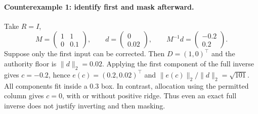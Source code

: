 \paragraph{Counterexample 1: identify first and mask afterward.}
Take $R=I$,
\[
 M=\begin{pmatrix}1&1\\0&0.1\end{pmatrix},\qquad
 d=\begin{pmatrix}0\\0.02\end{pmatrix},\qquad
 M^{-1}d=\begin{pmatrix}-0.2\\0.2\end{pmatrix}.
\]
Suppose only the first input can be corrected. Then $D=(1,0)^\top$ and
the authority floor is $\|d\|_2=0.02$. Applying the first component of the
full inverse gives $c=-0.2$, hence
$e(c)=(0.2,0.02)^\top$ and $\|e(c)\|_2/\|d\|_2=\sqrt{101}$.
All components fit inside a $0.3$ box. In contrast, allocation using the
permitted column gives $c=0$, with or without positive ridge. Thus even
an exact full inverse does not justify inverting and then masking.

